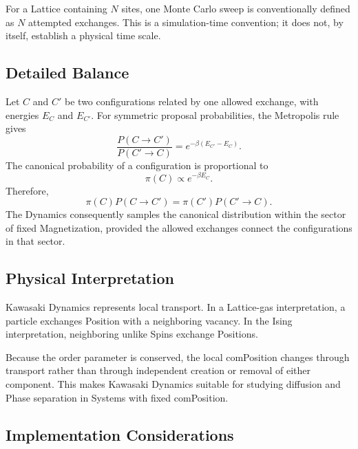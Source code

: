 \documentclass[a4paper, 10pt, onepage]{elegantbook}
\begin{document}
{For a Lattice containing \(N\) sites, one Monte Carlo sweep is
conventionally defined as \(N\) attempted exchanges. This is a
simulation-time convention; it does not, by itself, establish a
physical time scale.

\subsection{Detailed Balance}

Let \(C\) and \(C'\) be two configurations related by one allowed
exchange, with energies \(E_C\) and \(E_{C'}\). For symmetric proposal
probabilities, the Metropolis rule gives
\[
  \frac{P(C\to C')}{P(C'\to C)}
  =
  e^{-\beta(E_{C'}-E_C)}.
\]
The canonical probability of a configuration is proportional to
\[
  \pi(C)\propto e^{-\beta E_C}.
\]
Therefore,
\[
  \pi(C)P(C\to C')
  =
  \pi(C')P(C'\to C).
\]
The Dynamics consequently samples the canonical distribution within
the sector of fixed Magnetization, provided the allowed exchanges
connect the configurations in that sector.

\subsection{Physical Interpretation}

Kawasaki Dynamics represents local transport. In a Lattice-gas
interpretation, a particle exchanges Position with a neighboring
vacancy. In the Ising interpretation, neighboring unlike Spins
exchange Positions.

Because the order parameter is conserved, the local comPosition changes
through transport rather than through independent creation or removal
of either component. This makes Kawasaki Dynamics suitable for
studying diffusion and Phase separation in Systems with fixed
comPosition.

\subsection{Implementation Considerations}

}
\end{document}
